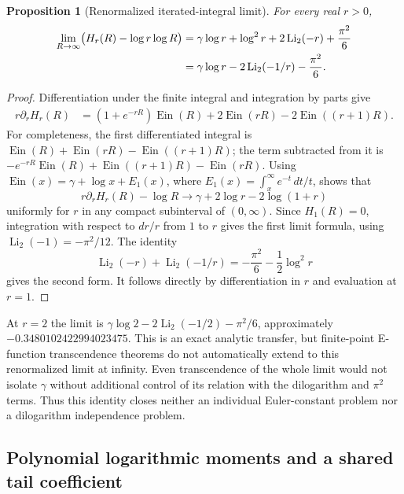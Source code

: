 \documentclass[11pt,a4paper]{article}
\newtheorem{proposition}[theorem]{Proposition}
\theoremstyle{definition}
\theoremstyle{remark}
\numberwithin{equation}{section}
\begin{document}
\begin{proposition}[Renormalized iterated-integral limit]
\label{gamma-Hr-limit}
For every real $r>0$,
\begin{align}
 \lim_{R\to\infty}\bigl(H_r(R)-\log r\log R\bigr)
 &=\gamma\log r+\log^2r
   +2\operatorname{Li}_2(-r)+\frac{\pi^2}{6}\notag\\
 &=\gamma\log r-2\operatorname{Li}_2(-1/r)-\frac{\pi^2}{6}.
 \label{gamma-Hr-formula}
\end{align}
\end{proposition}
\begin{proof}
Differentiation under the finite integral and integration by parts give
\begin{align*}
 r\partial_r H_r(R)
 &=(1+e^{-rR})\operatorname{Ein}(R)
    +2\operatorname{Ein}(rR)-2\operatorname{Ein}((r+1)R).
\end{align*}
For completeness, the first differentiated integral is
$\operatorname{Ein}(R)+\operatorname{Ein}(rR)
-\operatorname{Ein}((r+1)R)$; the term subtracted from it is
$-e^{-rR}\operatorname{Ein}(R)
+\operatorname{Ein}((r+1)R)-\operatorname{Ein}(rR)$.
Using $\operatorname{Ein}(x)=\gamma+\log x+E_1(x)$, where
$E_1(x)=\int_x^\infty e^{-t}\,dt/t$, shows that
\[
 r\partial_r H_r(R)-\log R
 \longrightarrow\gamma+2\log r-2\log(1+r)
\]
uniformly for $r$ in any compact subinterval of $(0,\infty)$.
Since $H_1(R)=0$, integration with respect to $dr/r$ from $1$ to
$r$ gives the first limit formula, using
$\operatorname{Li}_2(-1)=-\pi^2/12$. The identity
\[
 \operatorname{Li}_2(-r)+\operatorname{Li}_2(-1/r)
 =-\frac{\pi^2}{6}-\frac12\log^2r
\]
gives the second form. It follows directly by differentiation in $r$
and evaluation at $r=1$.
\end{proof}

At $r=2$ the limit is
$\gamma\log2-2\operatorname{Li}_2(-1/2)-\pi^2/6$, approximately
$-0.3480102422994023475$. This is an exact analytic transfer, but
finite-point E-function transcendence theorems do not automatically
extend to this renormalized limit at infinity. Even transcendence of
the whole limit would not isolate $\gamma$ without additional control
of its relation with the dilogarithm and $\pi^2$ terms. Thus this
identity closes neither an individual Euler-constant problem nor a
dilogarithm independence problem.

\subsection{Polynomial logarithmic moments and a shared tail coefficient}
\label{gamma-moments}
\end{document}
